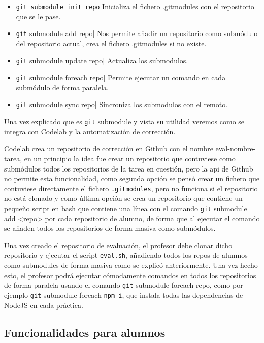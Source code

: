 \begin{itemize}
\item \verb|git submodule init repo| Inicializa el fichero .gitmodules con el repositorio que se le pase.
\item \verb|git| submodule add repo| Nos permite añadir un repositorio como submódulo del repositorio actual, crea el fichero .gitmodules si no existe.
\item \verb|git| submodule update repo| Actualiza los submodulos.
\item \verb|git| submodule foreach repo| Permite ejecutar un comando en cada submódulo de forma paralela.
\item \verb|git| submodule sync repo| Sincroniza los submodulos con el remoto.
\end{itemize}

Una vez explicado que es \verb|git| submodule y vista su utilidad veremos como se integra con Codelab y la automatización de corrección. 

Codelab crea un repositorio de corrección en Github con el nombre eval-nombre-tarea, en un principio la idea fue crear un repositorio que contuviese como submódulos todos los repositorios de la tarea en cuestión, pero la api de Github no permite esta funcionalidad, como segunda opción se pensó crear un fichero que contuviese directamente el fichero \verb|.gitmodules|, pero no funciona si el repositorio no está clonado y como última opción se crea un repositorio que contiene un pequeño script en bash que contiene una línea con el comando \verb|git| submodule add <repo> por cada repositorio de alumno, de forma que al ejecutar el comando se añaden todos los repositorios de forma masiva como submódulos.

Una vez creado el repositorio de evaluación, el profesor debe clonar dicho repositorio y ejecutar el script \verb|eval.sh|, añadiendo todos los repos de alumnos como submodules de forma masiva como se explicó anteriormente. Una vez hecho esto, el profesor podrá ejecutar cómodamente comandos en todos los repositorios de forma paralela usando el comando \verb|git| submodule foreach repo, como por ejemplo \verb|git| submodule foreach \verb|npm i|, que instala todas las dependencias de NodeJS en cada práctica.

\newpage 

\subsection{Funcionalidades para alumnos}
\label{3:6:3}

